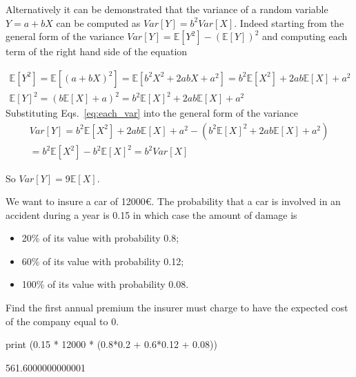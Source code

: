 \begin{solution}
Alternatively it can be demonstrated that the variance of a random variable $Y = a + bX$ can be computed as $Var[Y] = b^2 Var[X]$. Indeed starting from the general form of the variance $Var[Y] = \mathbb{E}[Y^2] - (\mathbb{E}[Y])^2$ and computing each term of the right hand side of the equation 

\begin{equation}
	\begin{gathered}
		\mathbb{E}[Y^2] = \mathbb{E}[(a+bX)^2] = \mathbb{E}[b^2X^2 + 2abX + a^2] = b^2\mathbb{E}[X^2] + 2ab\mathbb{E}[X]+ a^2  \\
		\mathbb{E}[Y]^2 =  (b\mathbb{E}[X] + a)^2 = b^2\mathbb{E}[X]^2 + 2ab\mathbb{E}[X]+ a^2  
		\label{eq:each_var}
	\end{gathered}
\end{equation}
Substituting Eqs.~\ref{eq:each_var} into the general form of the variance 
\begin{equation}
	\begin{gathered}
		Var[Y] = b^2\mathbb{E}[X^2] + 2ab\mathbb{E}[X]+ a^2 - (b^2\mathbb{E}[X]^2 + 2ab\mathbb{E}[X]+ a^2) \\ 
		= b^2\mathbb{E}[X^2] - b^2\mathbb{E}[X]^2 = b^2 Var[X]
	\end{gathered}     
\end{equation}

So $Var[Y] = 9\mathbb{E}[X]$.

\end{solution}

\begin{question}
We want to insure a car of 12000\euro. The probability that a car is involved in an accident during a year is 0.15 in which case the amount of damage is

\begin{itemize}
\tightlist
\item 20\% of its value with probability 0.8;
\item 60\% of its value with probability 0.12;
\item 100\% of its value with probability 0.08.
\end{itemize}
Find the first annual premium the insurer must charge to have the expected cost of the company equal to 0.
\end{question}

\cprotEnv\begin{solution}
\begin{ipython}
print (0.15 * 12000 * (0.8*0.2 + 0.6*0.12 + 0.08))
\end{ipython}
\begin{ioutput}
561.6000000000001	
\end{ioutput}
\end{solution}

